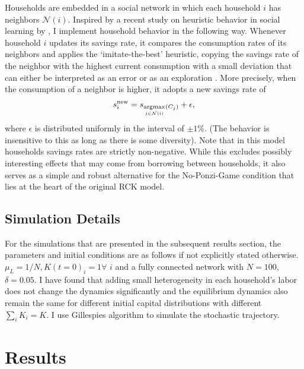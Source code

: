 Households are embedded in a social network in which each household $i$ has neighbors $\mathcal{N}(i)$. Inspired by a recent study on heuristic behavior in social learning by \cite{Barkoczi2016}, I implement household behavior in the following way.
Whenever household $i$ updates its savings rate, it compares the consumption rates of its neighbors and applies the `imitate-the-best' heuristic,
copying the savings rate of the neighbor with the highest current consumption with a small deviation that can either be interpreted as an error or as an exploration \cite{Mehlhorn2015}.
More precisely, when the consumption of a neighbor is higher,
it adopts a new savings rate of
\begin{equation} 
	s^\mathrm{new}_i = s_{\underset{j\in \mathcal{N}(i)}{\operatorname*{argmax}}_{} (C_j)} + \epsilon,
\end{equation}
where $\epsilon$ is distributed uniformly in the interval of $\pm 1\%$. (The behavior is insensitive to this as long as there is some diversity).
Note that in this model households savings rates are strictly non-negative. While this excludes possibly interesting effects that may come from borrowing between households, it  also serves as a simple and robust alternative for the No-Ponzi-Game condition that lies at the heart of the original RCK model. 

\subsection{Simulation Details}

For the simulations that are presented in the subsequent results section, the parameters and initial conditions are as follows if not explicitly stated otherwise.
$\mu_L = 1/N, K(t=0)_i \!= \!1 \forall\,\, i$ and a fully connected network with $N=100$, $\delta=0.05$. I have found that adding small heterogeneity in each household's labor does not change the dynamics significantly and the equilibrium dynamics also remain the same for different initial capital distributions with different $\sum_i K_i = K$. I use Gillespies algorithm \citep{Gillespie1977} to simulate the stochastic trajectory.

\section{Results}


